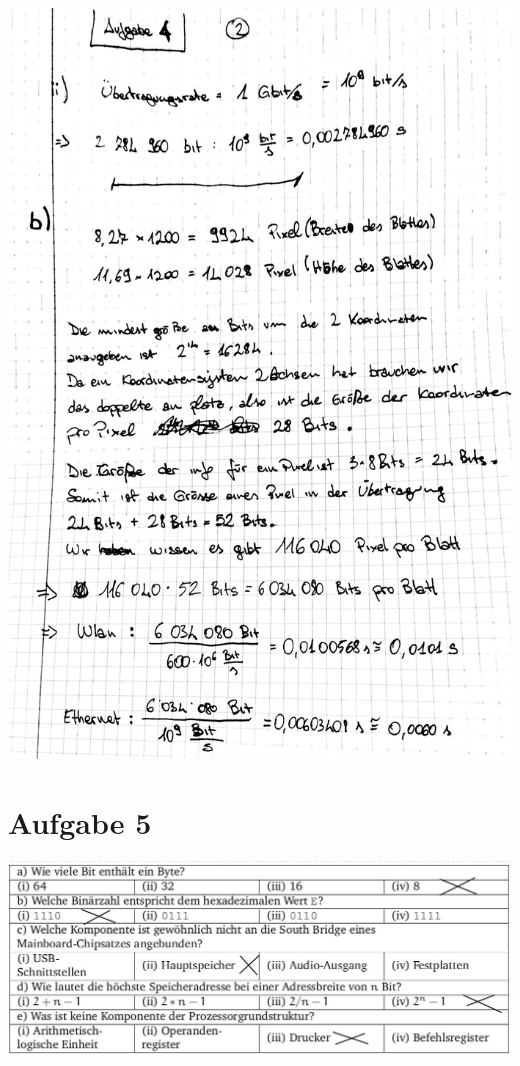 \documentclass[10pt,a4paper]{article}
\begin{document}
\includegraphics[scale=0.25]{rech_t1u4_2.jpg} 

\section{Aufgabe 5}
\includegraphics[scale=0.4]{L5.jpg} 
\end{document}

